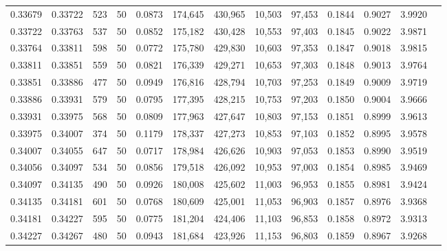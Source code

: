 \begin{tabular}{rrrrrrrrrrrrr}
0.33679 & 0.33722 &   523 &  50 &                                     0.0873 & 174,645 & 430,965 &  10,503 &  97,453 & 0.1844 & 0.9027 & 3.9920 \\
0.33722 & 0.33763 &   537 &  50 &                                     0.0852 & 175,182 & 430,428 &  10,553 &  97,403 & 0.1845 & 0.9022 & 3.9871 \\
0.33764 & 0.33811 &   598 &  50 &                                     0.0772 & 175,780 & 429,830 &  10,603 &  97,353 & 0.1847 & 0.9018 & 3.9815 \\
0.33811 & 0.33851 &   559 &  50 &                                     0.0821 & 176,339 & 429,271 &  10,653 &  97,303 & 0.1848 & 0.9013 & 3.9764 \\
0.33851 & 0.33886 &   477 &  50 &                                     0.0949 & 176,816 & 428,794 &  10,703 &  97,253 & 0.1849 & 0.9009 & 3.9719 \\
0.33886 & 0.33931 &   579 &  50 &                                     0.0795 & 177,395 & 428,215 &  10,753 &  97,203 & 0.1850 & 0.9004 & 3.9666 \\
0.33931 & 0.33975 &   568 &  50 &                                     0.0809 & 177,963 & 427,647 &  10,803 &  97,153 & 0.1851 & 0.8999 & 3.9613 \\
0.33975 & 0.34007 &   374 &  50 &                                     0.1179 & 178,337 & 427,273 &  10,853 &  97,103 & 0.1852 & 0.8995 & 3.9578 \\
0.34007 & 0.34055 &   647 &  50 &                                     0.0717 & 178,984 & 426,626 &  10,903 &  97,053 & 0.1853 & 0.8990 & 3.9519 \\
0.34056 & 0.34097 &   534 &  50 &                                     0.0856 & 179,518 & 426,092 &  10,953 &  97,003 & 0.1854 & 0.8985 & 3.9469 \\
0.34097 & 0.34135 &   490 &  50 &                                     0.0926 & 180,008 & 425,602 &  11,003 &  96,953 & 0.1855 & 0.8981 & 3.9424 \\
0.34135 & 0.34181 &   601 &  50 &                                     0.0768 & 180,609 & 425,001 &  11,053 &  96,903 & 0.1857 & 0.8976 & 3.9368 \\
0.34181 & 0.34227 &   595 &  50 &                                     0.0775 & 181,204 & 424,406 &  11,103 &  96,853 & 0.1858 & 0.8972 & 3.9313 \\
0.34227 & 0.34267 &   480 &  50 &                                     0.0943 & 181,684 & 423,926 &  11,153 &  96,803 & 0.1859 & 0.8967 & 3.9268 \\

\end{tabular}
